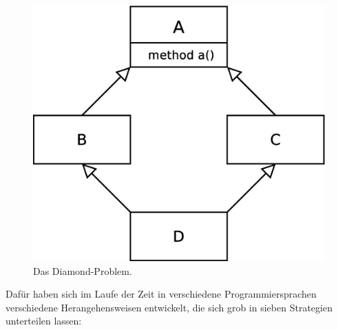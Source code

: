 \begin{figure}[h]
\centering
 \includegraphics[scale = 0.3]{pictures/diamond}
 \caption{Das Diamond-Problem.}
 \label{diamond}
\end{figure}

Dafür haben sich im Laufe der Zeit in verschiedene Programmiersprachen verschiedene Herangehensweisen entwickelt, die sich grob in sieben Strategien unterteilen lassen:


